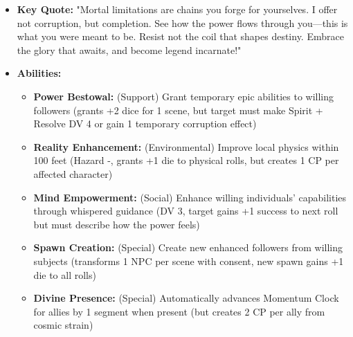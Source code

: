 \documentclass[11pt]{article}
\begin{document}
\begin{itemize}
  \item \textbf{Key Quote:} "Mortal limitations are chains you forge for yourselves. I offer not corruption, but completion. See how the power flows through you—this is what you were meant to be. Resist not the coil that shapes destiny. Embrace the glory that awaits, and become legend incarnate!"
  \item \textbf{Abilities:}
    \begin{itemize}
    \item \textbf{Power Bestowal:} (Support) Grant temporary epic abilities to willing followers (grants +2 dice for 1 scene, but target must make Spirit + Resolve DV 4 or gain 1 temporary corruption effect)
    \item \textbf{Reality Enhancement:} (Environmental) Improve local physics within 100 feet (Hazard -, grants +1 die to physical rolls, but creates 1 CP per affected character)
    \item \textbf{Mind Empowerment:} (Social) Enhance willing individuals' capabilities through whispered guidance (DV 3, target gains +1 success to next roll but must describe how the power feels)
    \item \textbf{Spawn Creation:} (Special) Create new enhanced followers from willing subjects (transforms 1 NPC per scene with consent, new spawn gains +1 die to all rolls)
    \item \textbf{Divine Presence:} (Special) Automatically advances Momentum Clock for allies by 1 segment when present (but creates 2 CP per ally from cosmic strain)
    \end{itemize}
\end{itemize}
\end{document}
